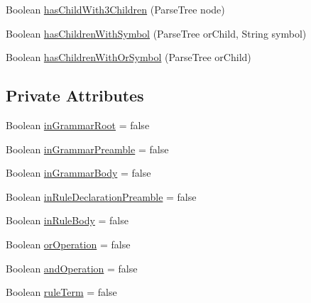 \begin{DoxyCompactItemize}
\item 
Boolean \hyperlink{classit_1_1emarolab_1_1cagg_1_1core_1_1language_1_1parser_1_1ANTLRInterface_1_1LogicalParserListener_ae717015087f91015159e8dd4c54ab08e}{has\-Child\-With3\-Children} (Parse\-Tree node)
\item 
Boolean \hyperlink{classit_1_1emarolab_1_1cagg_1_1core_1_1language_1_1parser_1_1ANTLRInterface_1_1LogicalParserListener_a6ba1f40cfc4a6fa613a6ec0468bb90b6}{has\-Children\-With\-Symbol} (Parse\-Tree or\-Child, String symbol)
\item 
Boolean \hyperlink{classit_1_1emarolab_1_1cagg_1_1core_1_1language_1_1parser_1_1ANTLRInterface_1_1LogicalParserListener_ae42ff30221c66777373d5a81de6e224a}{has\-Children\-With\-Or\-Symbol} (Parse\-Tree or\-Child)
\end{DoxyCompactItemize}
\subsection*{Private Attributes}
\begin{DoxyCompactItemize}
\item 
Boolean \hyperlink{classit_1_1emarolab_1_1cagg_1_1core_1_1language_1_1parser_1_1ANTLRInterface_1_1LogicalParserListener_a9782be29fa421c24634e4be711938619}{in\-Grammar\-Root} = false
\item 
Boolean \hyperlink{classit_1_1emarolab_1_1cagg_1_1core_1_1language_1_1parser_1_1ANTLRInterface_1_1LogicalParserListener_a9700ea2e8b9214f589270a3400e70719}{in\-Grammar\-Preamble} = false
\item 
Boolean \hyperlink{classit_1_1emarolab_1_1cagg_1_1core_1_1language_1_1parser_1_1ANTLRInterface_1_1LogicalParserListener_a7fb4c214bf55908ab986025ca2a2a17f}{in\-Grammar\-Body} = false
\item 
Boolean \hyperlink{classit_1_1emarolab_1_1cagg_1_1core_1_1language_1_1parser_1_1ANTLRInterface_1_1LogicalParserListener_a5484654862060db14379a9ea8088da3d}{in\-Rule\-Declaration\-Preamble} = false
\item 
Boolean \hyperlink{classit_1_1emarolab_1_1cagg_1_1core_1_1language_1_1parser_1_1ANTLRInterface_1_1LogicalParserListener_a06fbf6f53eff50aae6bf351f4caf8e83}{in\-Rule\-Body} = false
\item 
Boolean \hyperlink{classit_1_1emarolab_1_1cagg_1_1core_1_1language_1_1parser_1_1ANTLRInterface_1_1LogicalParserListener_a64517b29fdc360468a0dce54090a0751}{or\-Operation} = false
\item 
Boolean \hyperlink{classit_1_1emarolab_1_1cagg_1_1core_1_1language_1_1parser_1_1ANTLRInterface_1_1LogicalParserListener_a6f4b12c8a3d39b1d65420325d17a99df}{and\-Operation} = false
\item 
Boolean \hyperlink{classit_1_1emarolab_1_1cagg_1_1core_1_1language_1_1parser_1_1ANTLRInterface_1_1LogicalParserListener_abb6511e6611e1f0eb8a993c2f26eb429}{rule\-Term} = false
\end{DoxyCompactItemize}


